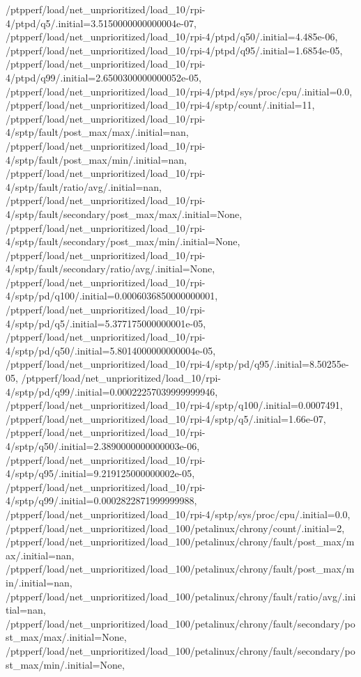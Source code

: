 {    /ptpperf/load/net_unprioritized/load_10/rpi-4/ptpd/q5/.initial=3.5150000000000004e-07,
    /ptpperf/load/net_unprioritized/load_10/rpi-4/ptpd/q50/.initial=4.485e-06,
    /ptpperf/load/net_unprioritized/load_10/rpi-4/ptpd/q95/.initial=1.6854e-05,
    /ptpperf/load/net_unprioritized/load_10/rpi-4/ptpd/q99/.initial=2.6500300000000052e-05,
    /ptpperf/load/net_unprioritized/load_10/rpi-4/ptpd/sys/proc/cpu/.initial=0.0,
    /ptpperf/load/net_unprioritized/load_10/rpi-4/sptp/count/.initial=11,
    /ptpperf/load/net_unprioritized/load_10/rpi-4/sptp/fault/post_max/max/.initial=nan,
    /ptpperf/load/net_unprioritized/load_10/rpi-4/sptp/fault/post_max/min/.initial=nan,
    /ptpperf/load/net_unprioritized/load_10/rpi-4/sptp/fault/ratio/avg/.initial=nan,
    /ptpperf/load/net_unprioritized/load_10/rpi-4/sptp/fault/secondary/post_max/max/.initial=None,
    /ptpperf/load/net_unprioritized/load_10/rpi-4/sptp/fault/secondary/post_max/min/.initial=None,
    /ptpperf/load/net_unprioritized/load_10/rpi-4/sptp/fault/secondary/ratio/avg/.initial=None,
    /ptpperf/load/net_unprioritized/load_10/rpi-4/sptp/pd/q100/.initial=0.0006036850000000001,
    /ptpperf/load/net_unprioritized/load_10/rpi-4/sptp/pd/q5/.initial=5.377175000000001e-05,
    /ptpperf/load/net_unprioritized/load_10/rpi-4/sptp/pd/q50/.initial=5.8014000000000004e-05,
    /ptpperf/load/net_unprioritized/load_10/rpi-4/sptp/pd/q95/.initial=8.50255e-05,
    /ptpperf/load/net_unprioritized/load_10/rpi-4/sptp/pd/q99/.initial=0.00022257039999999946,
    /ptpperf/load/net_unprioritized/load_10/rpi-4/sptp/q100/.initial=0.0007491,
    /ptpperf/load/net_unprioritized/load_10/rpi-4/sptp/q5/.initial=1.66e-07,
    /ptpperf/load/net_unprioritized/load_10/rpi-4/sptp/q50/.initial=2.3890000000000003e-06,
    /ptpperf/load/net_unprioritized/load_10/rpi-4/sptp/q95/.initial=9.219125000000002e-05,
    /ptpperf/load/net_unprioritized/load_10/rpi-4/sptp/q99/.initial=0.0002822871999999988,
    /ptpperf/load/net_unprioritized/load_10/rpi-4/sptp/sys/proc/cpu/.initial=0.0,
    /ptpperf/load/net_unprioritized/load_100/petalinux/chrony/count/.initial=2,
    /ptpperf/load/net_unprioritized/load_100/petalinux/chrony/fault/post_max/max/.initial=nan,
    /ptpperf/load/net_unprioritized/load_100/petalinux/chrony/fault/post_max/min/.initial=nan,
    /ptpperf/load/net_unprioritized/load_100/petalinux/chrony/fault/ratio/avg/.initial=nan,
    /ptpperf/load/net_unprioritized/load_100/petalinux/chrony/fault/secondary/post_max/max/.initial=None,
    /ptpperf/load/net_unprioritized/load_100/petalinux/chrony/fault/secondary/post_max/min/.initial=None,
}
